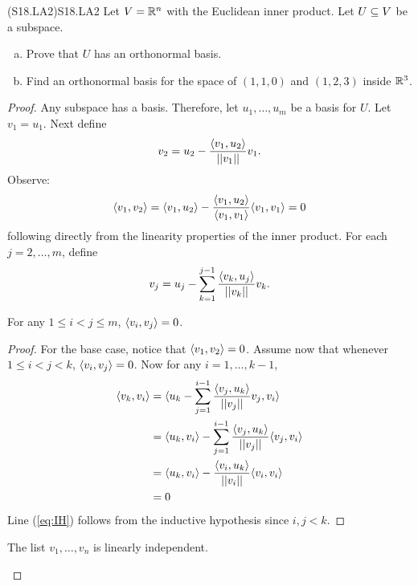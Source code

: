 \documentclass[../../AlgebraQualSolutions.tex]{subfiles}
\begin{document}
\begin{prob}{(S18.LA2)}{S18.LA2}
    Let $V = \R^n$ with the Euclidean inner product. Let $U \sq V$ be a subspace.
    \begin{enumerate}[(a)]
        \item Prove that $U$ has an orthonormal basis.
        \item Find an orthonormal basis for the space of $(1,1,0)$ and $(1,2,3)$ inside $\R^3$.
    \end{enumerate}
\end{prob}

\begin{proof}
    Any subspace has a basis. Therefore, let $u_1,\ldots, u_m$ be a basis for $U$. Let $v_1 = u_1$. Next define
        \[v_2 = u_2 - \frac{\ip{v_1}{u_2}}{\norm[v_1]}v_1.\]
    Observe:
        \[\ip{v_1}{v_2} = \ip{v_1}{u_2} - \frac{\ip{v_1}{u_2}}{\ip{v_1}{v_1}}\ip{v_1}{v_1} = 0\]
    following directly from the linearity properties of the inner product. For each $j = 2,\ldots,m$, define
        \[v_j = u_j - \sum_{k=1}^{j-1}\frac{\ip{v_k}{u_j}}{\norm[v_k]}v_k.\]

        \begin{claim}
            For any $1 \leq i < j \leq m$, $\ip{v_i}{v_j} = 0$.

            \begin{proof}
                For the base case, notice that $\ip{v_1}{v_2} = 0$. Assume now that whenever $1 \leq i < j < k$, $\ip{v_i}{v_j} = 0$. Now for any $i = 1, \ldots, k-1$,
                    \begin{align*}
                        \ip{v_k}{v_i} &= \ip{u_k - \sum_{j=1}^{i-1} \frac{\ip{v_j}{u_k}}{\norm[v_j]}v_j}{v_i}\\
                        &= \ip{u_k}{v_i} - \sum_{j=1}^{i-1} \frac{\ip{v_j}{u_k}}{\norm[v_j]}\ip{v_j}{v_i}\\
                        &= \ip{u_k}{v_i} - \frac{\ip{v_i}{u_k}}{\norm[v_i]}\ip{v_i}{v_i} \label{eq:IH}\\
                        &= 0
                    \end{align*}
                Line (\ref{eq:IH}) follows from the inductive hypothesis since $i, j < k$.
            \end{proof}
        \end{claim}

        \begin{claim}
            The list $v_1, \ldots, v_n$ is linearly independent.


\end{claim}
\end{proof}
\end{document}
